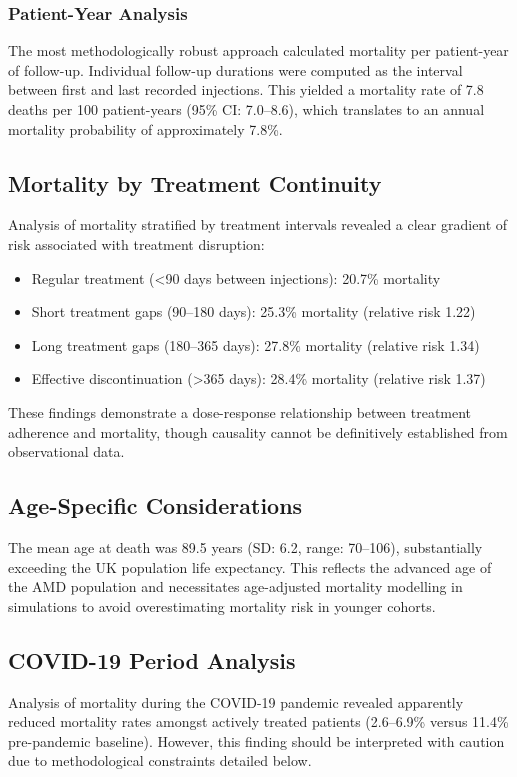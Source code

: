 \subsubsection{Patient-Year Analysis}
The most methodologically robust approach calculated mortality per patient-year of follow-up. Individual follow-up durations were computed as the interval between first and last recorded injections. This yielded a mortality rate of 7.8 deaths per 100 patient-years (95\% CI: 7.0--8.6), which translates to an annual mortality probability of approximately 7.8\%.

\subsection{Mortality by Treatment Continuity}
Analysis of mortality stratified by treatment intervals revealed a clear gradient of risk associated with treatment disruption:

\begin{itemize}
    \item Regular treatment (<90 days between injections): 20.7\% mortality
    \item Short treatment gaps (90--180 days): 25.3\% mortality (relative risk 1.22)
    \item Long treatment gaps (180--365 days): 27.8\% mortality (relative risk 1.34)
    \item Effective discontinuation (>365 days): 28.4\% mortality (relative risk 1.37)
\end{itemize}

These findings demonstrate a dose-response relationship between treatment adherence and mortality, though causality cannot be definitively established from observational data.

\subsection{Age-Specific Considerations}
The mean age at death was 89.5 years (SD: 6.2, range: 70--106), substantially exceeding the UK population life expectancy. This reflects the advanced age of the AMD population and necessitates age-adjusted mortality modelling in simulations to avoid overestimating mortality risk in younger cohorts.

\subsection{COVID-19 Period Analysis}
Analysis of mortality during the COVID-19 pandemic revealed apparently reduced mortality rates amongst actively treated patients (2.6--6.9\% versus 11.4\% pre-pandemic baseline). However, this finding should be interpreted with caution due to methodological constraints detailed below.

